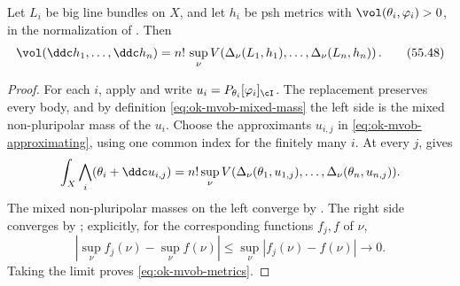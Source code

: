 \begin{theorem}\label{thm:ok-mvob-metrics}
Let \(L_i\) be big line bundles on \(X\), and let \(h_i\) be psh metrics
with \(\vol(\theta_i,\varphi_i)>0\), in the normalization of
.  Then
\[
 \vol(\ddc h_1,\dots,\ddc h_n)
 =n!\,\sup_\nu V\!\left(
    \Delta_\nu(L_1,h_1),\dots,\Delta_\nu(L_n,h_n)\right).
\tag{55.48}\label{eq:ok-mvob-metrics}
\]
\end{theorem}

\begin{proof}
For each \(i\), apply  and write
\(u_i=P_{\theta_i}[\varphi_i]_{\cI}\).  The replacement preserves every
body, and by definition \eqref{eq:ok-mvob-mixed-mass} the left side is the
mixed non-pluripolar mass of the \(u_i\).  Choose the approximants
\(u_{i,j}\) in \eqref{eq:ok-mvob-approximating}, using one common index for
the finitely many \(i\).  At every \(j\),
 gives
\[
 \int_X\bigwedge_i(\theta_i+\ddc u_{i,j})
 =n!\sup_\nu V(\Delta_\nu(\theta_1,u_{1,j}),\ldots,
                    \Delta_\nu(\theta_n,u_{n,j})).
\]
The mixed non-pluripolar masses on the left converge by
\cite[Theorem~6.2.1]{XiaBook}.  The right side converges by
; explicitly, for the corresponding functions
\(f_j,f\) of \(\nu\),
\[
 \left|\sup_\nu f_j(\nu)-\sup_\nu f(\nu)\right|
 \leq\sup_\nu|f_j(\nu)-f(\nu)|\longrightarrow0.
\]
Taking the limit proves \eqref{eq:ok-mvob-metrics}.
\end{proof}
